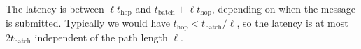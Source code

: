 \documentclass[11pt]{IEEEtran}
\begin{document}
The latency is between $\ell t_\mathrm{hop}$ and $t_\mathrm{batch} +
\ell t_\mathrm{hop}$, depending on when the message is submitted.
Typically we would have $t_\mathrm{hop} < t_\mathrm{batch}/\ell$, so the
latency is at most $2t_\mathrm{batch}$ independent of the path length
$\ell$.










\end{document}
